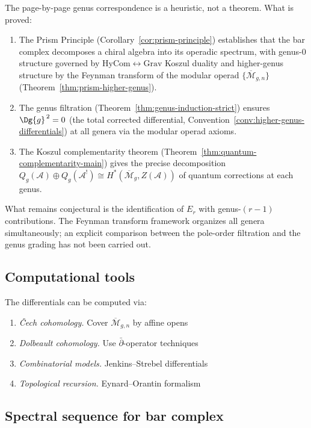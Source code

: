 \begin{remark}\label{rem:ss-genus-scope}
The page-by-page genus correspondence is a heuristic, not a theorem. What is proved:
\begin{enumerate}
\item The Prism Principle (Corollary~\ref{cor:prism-principle}) establishes that the bar complex decomposes a chiral algebra into its operadic spectrum, with genus-0 structure governed by $\mathrm{HyCom} \leftrightarrow \mathrm{Grav}$ Koszul duality and higher-genus structure by the Feynman transform of the modular operad $\{\overline{\mathcal{M}}_{g,n}\}$ (Theorem~\ref{thm:prism-higher-genus}).
\item The genus filtration (Theorem~\ref{thm:genus-induction-strict}) ensures $\Dg{g}^{\,2} = 0$ (the total corrected differential, Convention~\ref{conv:higher-genus-differentials}) at all genera via the modular operad axioms.
\item The Koszul complementarity theorem (Theorem~\ref{thm:quantum-complementarity-main}) gives the precise decomposition $Q_g(\mathcal{A}) \oplus Q_g(\mathcal{A}^!) \cong H^*(\overline{\mathcal{M}}_g, Z(\mathcal{A}))$ of quantum corrections at each genus.
\end{enumerate}
What remains conjectural is the identification of $E_r$ with genus-$(r-1)$ contributions. The Feynman transform framework organizes all genera simultaneously; an explicit comparison between the pole-order filtration and the genus grading has not been carried out.
\end{remark}

\subsection{Computational tools}

The differentials can be computed via:
\begin{enumerate}
\item \emph{\v{C}ech cohomology.} Cover $\overline{\mathcal{M}}_{g,n}$ by affine opens
\item \emph{Dolbeault cohomology.} Use $\bar{\partial}$-operator techniques
\item \emph{Combinatorial models.} Jenkins--Strebel differentials
\item \emph{Topological recursion.} Eynard--Orantin formalism
\end{enumerate}

\subsection{Spectral sequence for bar complex}


